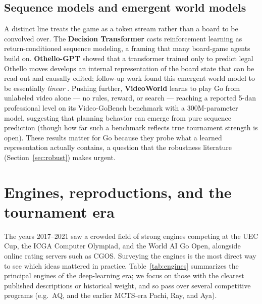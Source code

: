 \documentclass[11pt]{article}
\begin{document}
\subsection{Sequence models and emergent world models}
A distinct line treats the game as a token stream rather than a board to be convolved over.
The \textbf{Decision Transformer} \cite{decisiontransformer2021} casts reinforcement
learning as return-conditioned sequence modeling, a framing that many board-game agents
build on. \textbf{Othello-GPT} \cite{othellogpt2023} showed that a transformer trained only
to predict legal Othello moves develops an internal representation of the board state that
can be read out and causally edited; follow-up work found this emergent world model to be
essentially \emph{linear} \cite{othellolinear2023}. Pushing further, \textbf{VideoWorld}
\cite{videoworld2025} learns to play Go from unlabeled video alone --- no rules, reward, or
search --- reaching a reported 5-dan professional level on its Video-GoBench benchmark with a
300M-parameter model, suggesting that planning behavior can emerge from pure sequence
prediction (though how far such a benchmark reflects true tournament strength is open). These results matter for Go because they probe what a
learned representation actually contains, a question that the robustness literature
(Section~\ref{sec:robust}) makes urgent.

\section{Engines, reproductions, and the tournament era}
\label{sec:engines}
The years 2017--2021 saw a crowded field of strong engines competing at the UEC Cup, the
ICGA Computer Olympiad, and the World AI Go Open, alongside online rating servers such as
CGOS. Surveying the engines is the most direct way to see which ideas mattered in practice.
Table~\ref{tab:engines} summarizes the principal engines of the deep-learning era; we focus
on those with the clearest published descriptions or historical weight, and so pass over
several competitive programs (e.g.\ AQ, and the earlier MCTS-era Pachi, Ray, and Aya).
\end{document}

